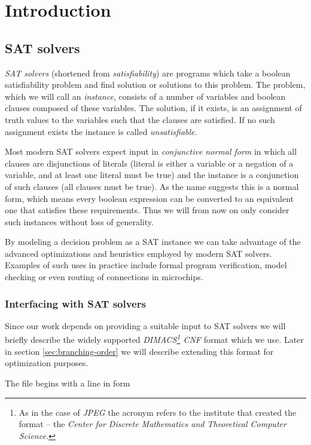 \section{Introduction}

\subsection{SAT solvers}
\emph{SAT solvers} (shortened from \emph{satisfiability}) are programs which take a boolean satisfiability problem and find solution or solutions to this problem.
The problem, which we will call an \emph{instance}, consists of a number of variables and boolean clauses composed of these variables.
The solution, if it exists, is an assignment of truth values to the variables such that the clauses are satisfied.
If no such assignment exists the instance is called \emph{unsatisfiable}.

Most modern SAT solvers expect input in \emph{conjunctive normal form} in which all clauses are disjunctions of literals (literal is either a variable or a negation of a variable, and at least one literal must be true) and the instance is a conjunction of such clauses (all clauses must be true).
As the name suggests this is a normal form, which means every boolean expression can be converted to an equivalent one that satisfies these requirements.
Thus we will from now on only consider such instances without loss of generality.

By modeling a decision problem as a SAT instance we can take advantage of the advanced optimizations and heuristics employed by modern SAT solvers.
Examples of such uses in practice include formal program verification, model checking or even routing of connections in microchips.

\subsubsection{Interfacing with SAT solvers}
\label{sec:dimacs}
Since our work depends on providing a suitable input to SAT solvers we will briefly describe the widely supported \emph{DIMACS\footnote{As in the case of \emph{JPEG} the acronym refers to the institute that created the format -- the \emph{Center for Discrete Mathematics and Theoretical Computer Science.}} CNF} format which we use.
Later in section \ref{sec:branching-order} we will describe extending this format for optimization purposes.

The file begins with a line in form


